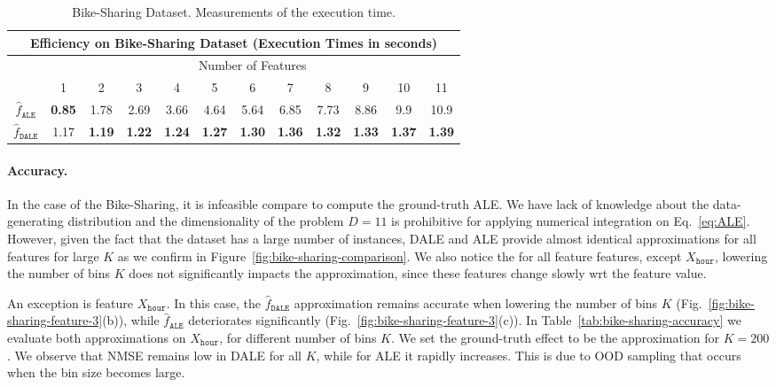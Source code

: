 \documentclass[wcp]{jmlr}
\newcommand{\dale}{\hat{f}_{\mathtt{DALE}}}
\newcommand{\alep}{\hat{f}_{\mathtt{ALE}}}
\begin{document}
\begin{table}
  \caption{Bike-Sharing Dataset. Measurements of the execution time.}
  \label{tab:bike-sharing-efficiency} \centering
  \begin{tabular}{c|c|c|c|c|c|c|c|c|c|c|c}
    \multicolumn{12}{c}{Efficiency on Bike-Sharing Dataset (Execution Times in seconds)} \\
    \hline\hline & \multicolumn{11}{|c}{Number of Features} \\
    \hline & 1 & 2 & 3 & 4 & 5 & 6 & 7 & 8 & 9 & 10 & 11 \\
    \hline \( \alep \) & \textbf{0.85} & 1.78 & 2.69 & 3.66 & 4.64 & 5.64 & 6.85 & 7.73 & 8.86 & 9.9 & 10.9 \\
    \hline \( \dale \) & 1.17 & \textbf{1.19} & \textbf{1.22} & \textbf{1.24} & \textbf{1.27} & \textbf{1.30} & \textbf{1.36} & \textbf{1.32} & \textbf{1.33} & \textbf{1.37} & \textbf{1.39} \\
    \hline
  \end{tabular}
\end{table}

\paragraph{Accuracy.}

In the case of the Bike-Sharing, it is infeasible compare to compute the ground-truth ALE. We have lack of knowledge about the data-generating distribution and the dimensionality of the problem \(D=11\) is prohibitive for applying numerical integration on Eq.~\eqref{eq:ALE}. However, given the fact that the dataset has a large number of instances, DALE and ALE provide almost identical approximations for all features for large \(K\) as we confirm in Figure~\ref{fig:bike-sharing-comparison}. We also notice the for all feature features, except \(X_{\mathtt{hour}}\), lowering the number of bins \(K\) does not significantly impacts the approximation, since these features change slowly wrt the feature value.

An exception is feature \(X_{\mathtt{hour}}\). In this case, the \(\dale\) approximation remains accurate when lowering the number of bins \(K\) (Fig.~\ref{fig:bike-sharing-feature-3}(b)), while \(\hat{f}_{\mathtt{ALE}}\) deteriorates significantly (Fig.~\ref{fig:bike-sharing-feature-3}(c)). In Table~\ref{tab:bike-sharing-accuracy} we evaluate both approximations on \(X_{\mathtt{hour}}\), for different number of bins \(K\). We set the ground-truth effect to be the approximation for \(K=200\). We observe that NMSE remains low in DALE for all \(K\), while for ALE it rapidly increases. This is due to OOD sampling that occurs when the bin size becomes large.
\end{document}
